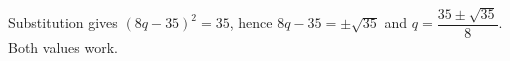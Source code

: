 Substitution gives $(8q-35)^2=35$, hence $8q-35=\pm\sqrt{35}$ and $\boxed{q=\dfrac{35\pm\sqrt{35}}{8}}$. Both values work.
